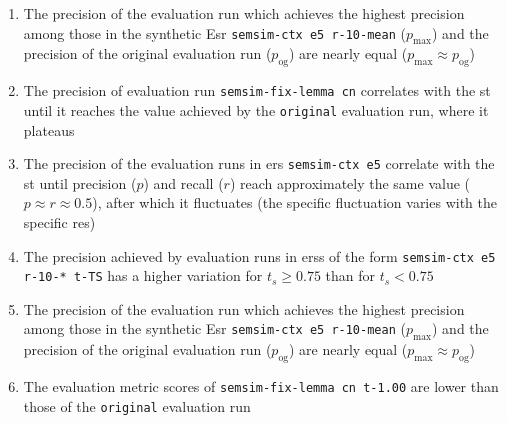 \documentclass[11pt]{scrreprt}
\newcounter{listcounter}
\begin{document}
{\begin{enumerate}[label=\arabic{listcounter}.\arabic*]
	\item The precision of the evaluation run which achieves the highest precision among those in the synthetic E\gls{sr} \texttt{semsim-ctx e5 r-10-mean} (\(p_\text{max}\)) and the precision of the original evaluation run (\(p_\text{og}\)) are nearly equal (\(p_\text{max} \approx p_\text{og}\)) \label{obs-itm:cness-highest-precision-equal-original} 	
	\item The precision of evaluation run \texttt{semsim-fix-lemma cn}  correlates with the \gls{st} until it reaches the value achieved by the \texttt{original} evaluation run, where it plateaus \label{obs-itm:fness-st-precision-correlates}
	\item The precision of the evaluation runs in \gls{ers} \texttt{semsim-ctx e5} correlate with the \gls{st} until precision (\(p\)) and recall (\(r\)) reach approximately the same value (\(p \approx r \approx 0.5\)), after which it fluctuates (the specific fluctuation varies with the specific \gls{res}) \label{obs-itm:cness-st-precision-correlates-until-crosspoint}

	\item The precision achieved by evaluation runs in \gls{ers}s of the form \texttt{semsim-ctx e5 r-10-* t-TS} has a higher variation for \(t_s \geq 0.75\) than for \(t_s < 0.75\) \label{obs-itm:cness-precision-variation-higher-ASTR}
	\item The precision of the evaluation run which achieves the highest precision among those in the synthetic E\gls{sr} \texttt{semsim-ctx e5 r-10-mean} (\(p_\text{max}\)) and the precision of the original evaluation run (\(p_\text{og}\)) are nearly equal (\(p_\text{max} \approx p_\text{og}\)) \label{obs-itm:cness-highest-precision-equal-original} 	
	\item The evaluation metric scores of \texttt{semsim-fix-lemma cn t-1.00} are lower than those of the \texttt{original} evaluation run \label{obs-itm:fness-st-limit}


\end{enumerate} 

}
\end{document}
